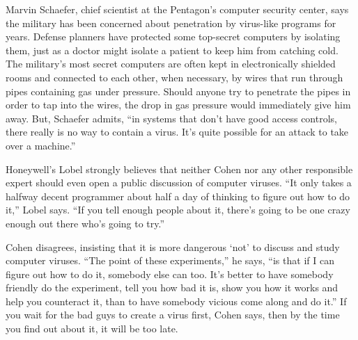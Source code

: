   Marvin Schaefer, chief scientist at the Pentagon's computer security 
center,  says  the  military has been concerned about  penetration  by 
virus-like programs for years.   Defense planners have protected  some 
top-secret computers by isolating them, just as a doctor might isolate 
a patient to keep him from catching cold.   The military's most secret 
computers   are  often  kept  in  electronically  shielded  rooms  and 
connected  to each other,  when necessary,  by wires that run  through 
pipes  containing gas under pressure.  Should anyone try to  penetrate 
the  pipes in order to tap into the wires,  the drop in  gas  pressure 
would immediately give him away.   But,  Schaefer admits,  ``in systems 
that  don't  have  good access controls,  there really is  no  way  to 
contain  a  virus.  It's quite possible for an attack to take  over  a 
machine.'' 

  Honeywell's Lobel strongly believes that neither Cohen nor any other 
responsible  expert  should even open a public discussion of  computer 
viruses.   ``It only takes a halfway decent programmer about half a day 
of  thinking to figure out how to do it,'' Lobel says.   ``If  you  tell 
enough people about it, there's going to be one crazy enough out there 
who's going to try.'' 

  Cohen  disagrees,  insisting  that  it is more  dangerous  `not'  to 
discuss and study computer viruses.  ``The point of these experiments,'' 
he says,  ``is that if I can figure out how to do it, somebody else can 
too.   It's  better to have somebody friendly do the experiment,  tell 
you how bad it is,  show you how it works and help you counteract  it, 
than  to have somebody vicious come along and do it.'' If you wait  for 
the bad guys to create a virus first, Cohen says, then by the time you 
find out about it, it will be too late. 

